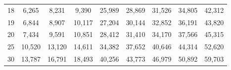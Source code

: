 \begin{table}[ht]
\begin{tabular}{@{}c|cccccccc@{}}
18 & 6{,}265 & 8{,}231 & 9{,}390 & 25{,}989 & 28{,}869 & 31{,}526 & 34{,}805 & 42{,}312 \\
19 & 6{,}844 & 8{,}907 & 10{,}117 & 27{,}204 & 30{,}144 & 32{,}852 & 36{,}191 & 43{,}820 \\
20 & 7{,}434 & 9{,}591 & 10{,}851 & 28{,}412 & 31{,}410 & 34{,}170 & 37{,}566 & 45{,}315 \\
25 & 10{,}520 & 13{,}120 & 14{,}611 & 34{,}382 & 37{,}652 & 40{,}646 & 44{,}314 & 52{,}620 \\
30 & 13{,}787 & 16{,}791 & 18{,}493 & 40{,}256 & 43{,}773 & 46{,}979 & 50{,}892 & 59{,}703 \\
\bottomrule
\end{tabular}
\end{table}


